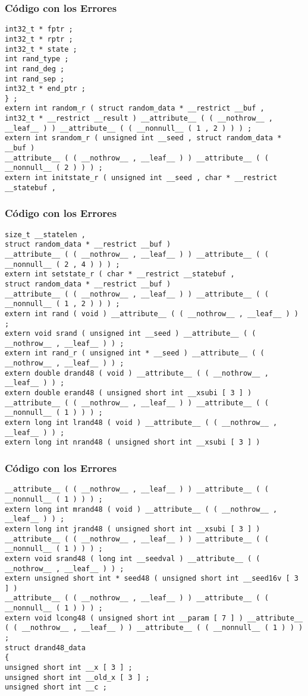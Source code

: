 \documentclass{beamer}
\begin{document}
\begin{frame}[fragile]
\frametitle{C\'odigo con los Errores}
\begin{lstlisting}[style=CStyle]
int32_t * fptr ; 
int32_t * rptr ; 
int32_t * state ; 
int rand_type ; 
int rand_deg ; 
int rand_sep ; 
int32_t * end_ptr ; 
} ; 
extern int random_r ( struct random_data * __restrict __buf , 
int32_t * __restrict __result ) __attribute__ ( ( __nothrow__ , __leaf__ ) ) __attribute__ ( ( __nonnull__ ( 1 , 2 ) ) ) ; 
extern int srandom_r ( unsigned int __seed , struct random_data * __buf ) 
__attribute__ ( ( __nothrow__ , __leaf__ ) ) __attribute__ ( ( __nonnull__ ( 2 ) ) ) ; 
extern int initstate_r ( unsigned int __seed , char * __restrict __statebuf , 
\end{lstlisting}
\end{frame}
\begin{frame}[fragile]
\frametitle{C\'odigo con los Errores}
\begin{lstlisting}[style=CStyle]
size_t __statelen , 
struct random_data * __restrict __buf ) 
__attribute__ ( ( __nothrow__ , __leaf__ ) ) __attribute__ ( ( __nonnull__ ( 2 , 4 ) ) ) ; 
extern int setstate_r ( char * __restrict __statebuf , 
struct random_data * __restrict __buf ) 
__attribute__ ( ( __nothrow__ , __leaf__ ) ) __attribute__ ( ( __nonnull__ ( 1 , 2 ) ) ) ; 
extern int rand ( void ) __attribute__ ( ( __nothrow__ , __leaf__ ) ) ; 
extern void srand ( unsigned int __seed ) __attribute__ ( ( __nothrow__ , __leaf__ ) ) ; 
extern int rand_r ( unsigned int * __seed ) __attribute__ ( ( __nothrow__ , __leaf__ ) ) ; 
extern double drand48 ( void ) __attribute__ ( ( __nothrow__ , __leaf__ ) ) ; 
extern double erand48 ( unsigned short int __xsubi [ 3 ] ) __attribute__ ( ( __nothrow__ , __leaf__ ) ) __attribute__ ( ( __nonnull__ ( 1 ) ) ) ; 
extern long int lrand48 ( void ) __attribute__ ( ( __nothrow__ , __leaf__ ) ) ; 
extern long int nrand48 ( unsigned short int __xsubi [ 3 ] ) 
\end{lstlisting}
\end{frame}
\begin{frame}[fragile]
\frametitle{C\'odigo con los Errores}
\begin{lstlisting}[style=CStyle]
__attribute__ ( ( __nothrow__ , __leaf__ ) ) __attribute__ ( ( __nonnull__ ( 1 ) ) ) ; 
extern long int mrand48 ( void ) __attribute__ ( ( __nothrow__ , __leaf__ ) ) ; 
extern long int jrand48 ( unsigned short int __xsubi [ 3 ] ) 
__attribute__ ( ( __nothrow__ , __leaf__ ) ) __attribute__ ( ( __nonnull__ ( 1 ) ) ) ; 
extern void srand48 ( long int __seedval ) __attribute__ ( ( __nothrow__ , __leaf__ ) ) ; 
extern unsigned short int * seed48 ( unsigned short int __seed16v [ 3 ] ) 
__attribute__ ( ( __nothrow__ , __leaf__ ) ) __attribute__ ( ( __nonnull__ ( 1 ) ) ) ; 
extern void lcong48 ( unsigned short int __param [ 7 ] ) __attribute__ ( ( __nothrow__ , __leaf__ ) ) __attribute__ ( ( __nonnull__ ( 1 ) ) ) ; 
struct drand48_data 
{ 
unsigned short int __x [ 3 ] ; 
unsigned short int __old_x [ 3 ] ; 
unsigned short int __c ; 
\end{lstlisting}
\end{frame}
\end{document}
